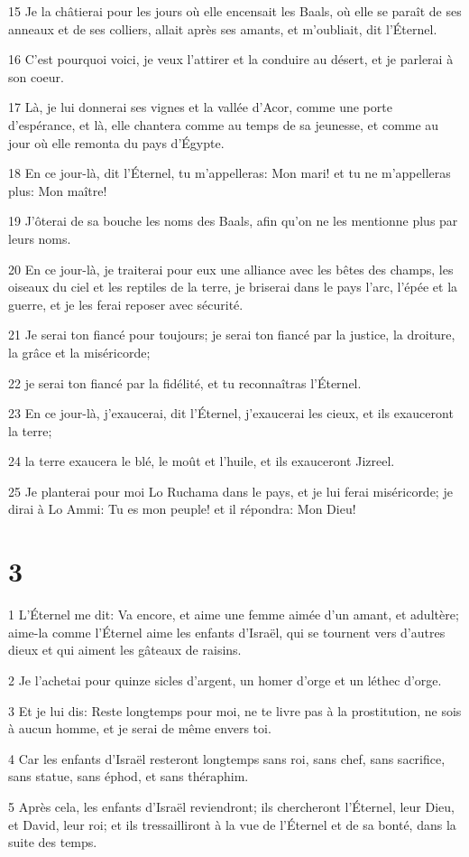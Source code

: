 \par 15 Je la châtierai pour les jours où elle encensait les Baals, où elle se paraît de ses anneaux et de ses colliers, allait après ses amants, et m'oubliait, dit l'Éternel.
\par 16 C'est pourquoi voici, je veux l'attirer et la conduire au désert, et je parlerai à son coeur.
\par 17 Là, je lui donnerai ses vignes et la vallée d'Acor, comme une porte d'espérance, et là, elle chantera comme au temps de sa jeunesse, et comme au jour où elle remonta du pays d'Égypte.
\par 18 En ce jour-là, dit l'Éternel, tu m'appelleras: Mon mari! et tu ne m'appelleras plus: Mon maître!
\par 19 J'ôterai de sa bouche les noms des Baals, afin qu'on ne les mentionne plus par leurs noms.
\par 20 En ce jour-là, je traiterai pour eux une alliance avec les bêtes des champs, les oiseaux du ciel et les reptiles de la terre, je briserai dans le pays l'arc, l'épée et la guerre, et je les ferai reposer avec sécurité.
\par 21 Je serai ton fiancé pour toujours; je serai ton fiancé par la justice, la droiture, la grâce et la miséricorde;
\par 22 je serai ton fiancé par la fidélité, et tu reconnaîtras l'Éternel.
\par 23 En ce jour-là, j'exaucerai, dit l'Éternel, j'exaucerai les cieux, et ils exauceront la terre;
\par 24 la terre exaucera le blé, le moût et l'huile, et ils exauceront Jizreel.
\par 25 Je planterai pour moi Lo Ruchama dans le pays, et je lui ferai miséricorde; je dirai à Lo Ammi: Tu es mon peuple! et il répondra: Mon Dieu!

\chapter{3}

\par 1 L'Éternel me dit: Va encore, et aime une femme aimée d'un amant, et adultère; aime-la comme l'Éternel aime les enfants d'Israël, qui se tournent vers d'autres dieux et qui aiment les gâteaux de raisins.
\par 2 Je l'achetai pour quinze sicles d'argent, un homer d'orge et un léthec d'orge.
\par 3 Et je lui dis: Reste longtemps pour moi, ne te livre pas à la prostitution, ne sois à aucun homme, et je serai de même envers toi.
\par 4 Car les enfants d'Israël resteront longtemps sans roi, sans chef, sans sacrifice, sans statue, sans éphod, et sans théraphim.
\par 5 Après cela, les enfants d'Israël reviendront; ils chercheront l'Éternel, leur Dieu, et David, leur roi; et ils tressailliront à la vue de l'Éternel et de sa bonté, dans la suite des temps.

